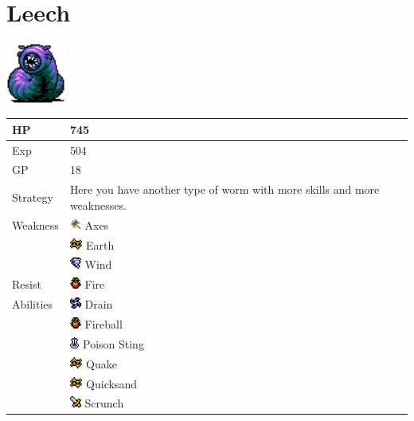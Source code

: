 \section{Leech}
\label{monster:leech}

\includegraphics[height=2cm,keepaspectratio]{./resources/monster/leech}

\begin{longtable}{ l p{9cm} }
	HP
	& 745
\\ \hline
	Exp
	& 504
\\ \hline
	GP
	& 18
\\ \hline
	Strategy
	& Here you have another type of worm with more skills and more weaknesses.
\\ \hline
	Weakness
	& \includegraphics[height=1em,keepaspectratio]{./resources/effects/axe} Axes \\
	& \includegraphics[height=1em,keepaspectratio]{./resources/effects/earth} Earth \\
	& \includegraphics[height=1em,keepaspectratio]{./resources/effects/wind} Wind
\\ \hline
	Resist
	& \includegraphics[height=1em,keepaspectratio]{./resources/effects/fire} Fire
\\ \hline
	Abilities
	& \includegraphics[height=1em,keepaspectratio]{./resources/effects/drain} Drain \\
	& \includegraphics[height=1em,keepaspectratio]{./resources/effects/fire} Fireball \\
	& \includegraphics[height=1em,keepaspectratio]{./resources/effects/poison} Poison Sting \\
	& \includegraphics[height=1em,keepaspectratio]{./resources/effects/earth} Quake \\
	& \includegraphics[height=1em,keepaspectratio]{./resources/effects/earth} Quicksand \\
	& \includegraphics[height=1em,keepaspectratio]{./resources/effects/damage} Scrunch
\end{longtable}
